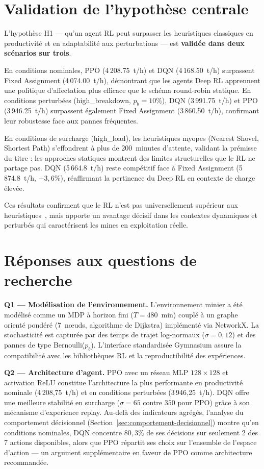 \documentclass[11pt,a4paper]{report}
\begin{document}
\section*{Validation de l'hypothèse centrale}

L'hypothèse H1 --- qu'un agent RL peut surpasser les heuristiques classiques en productivité et en adaptabilité aux perturbations --- est \textbf{validée dans deux scénarios sur trois}.

En conditions nominales, PPO (4\,208.75~t/h) et DQN (4\,168.50~t/h) surpassent Fixed Assignment (4\,074.00~t/h), démontrant que les agents Deep RL apprennent une politique d'affectation plus efficace que le schéma round-robin statique. En conditions perturbées (high\_breakdown, $p_b = 10\%$), DQN (3\,991.75~t/h) et PPO (3\,946.25~t/h) surpassent également Fixed Assignment (3\,860.50~t/h), confirmant leur robustesse face aux pannes fréquentes.

En conditions de surcharge (high\_load), les heuristiques myopes (Nearest Shovel, Shortest Path) s'effondrent à plus de 200~minutes d'attente, validant la prémisse du titre : les approches statiques montrent des limites structurelles que le RL ne partage pas. DQN (5\,664.8~t/h) reste compétitif face à Fixed Assignment (5\,874.8~t/h, $-3{,}6\%$), réaffirmant la pertinence du Deep RL en contexte de charge élevée.

Ces résultats confirment que le RL n'est pas universellement supérieur aux heuristiques~\cite{HazrathosseiniAfrapoli2024}, mais apporte un avantage décisif dans les contextes dynamiques et perturbés qui caractérisent les mines en exploitation réelle.

\section*{Réponses aux questions de recherche}

\textbf{Q1 — Modélisation de l'environnement.}
L'environnement minier a été modélisé comme un MDP à horizon fini
($T = 480$~min) couplé à un graphe orienté pondéré (7~nœuds,
algorithme de Dijkstra) implémenté via NetworkX. La stochasticité
est capturée par des temps de trajet log-normaux ($\sigma = 0{,}12$)
et des pannes de type Bernoulli($p_b$). L'interface standardisée
Gymnasium assure la compatibilité avec les bibliothèques RL et la
reproductibilité des expériences.

\textbf{Q2 — Architecture d'agent.}
PPO avec un réseau MLP $128 \times 128$ et activation ReLU constitue
l'architecture la plus performante en productivité nominale
(4\,208{,}75~t/h) et en conditions perturbées (3\,946{,}25~t/h).
DQN offre une meilleure stabilité en surcharge ($\sigma = 65$ contre
$350$ pour PPO) grâce à son mécanisme d'experience replay. Au-delà
des indicateurs agrégés, l'analyse du comportement décisionnel
(Section~\ref{sec:comportement-decisionnel}) montre qu'en conditions
nominales, DQN concentre $80{,}3\%$ de ses décisions sur seulement
2 des 7 actions disponibles, alors que PPO répartit ses choix sur
l'ensemble de l'espace d'action --- un argument supplémentaire en
faveur de PPO comme architecture recommandée.
\end{document}
